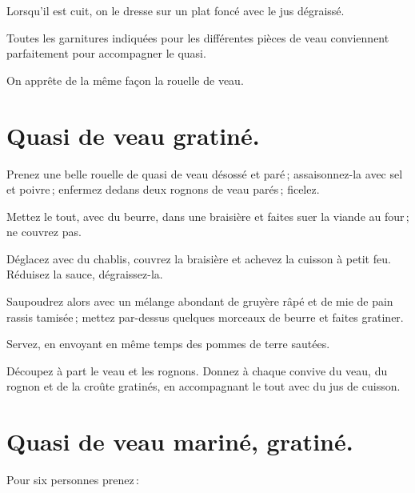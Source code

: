Lorsqu'il est cuit, on le dresse sur un plat foncé avec le jus dégraissé.

Toutes les garnitures indiquées pour les différentes pièces de veau conviennent
parfaitement pour accompagner le quasi.

\sk

On apprête de la même façon la rouelle de veau.

\section*{\centering Quasi de veau gratiné.}
{}

Prenez une belle rouelle de quasi de veau désossé et paré ; assaisonnez-la avec
sel et poivre ; enfermez dedans deux rognons de veau parés ; ficelez.

Mettez le tout, avec du beurre, dans une braisière et faites suer la viande au
four ; ne couvrez pas.

Déglacez avec du chablis, couvrez la braisière et achevez la cuisson à petit feu.
Réduisez la sauce, dégraissez-la.

Saupoudrez alors avec un mélange abondant de gruyère râpé et de mie de pain
rassis tamisée ; mettez par-dessus quelques morceaux de beurre et faites
gratiner.

Servez, en envoyant en même temps des pommes de terre sautées.

Découpez à part le veau et les rognons. Donnez à chaque convive du veau, du
rognon et de la croûte gratinés, en accompagnant le tout avec du jus de
cuisson.

\section*{\centering Quasi de veau mariné, gratiné.}
{}

Pour six personnes prenez :

\medskip


